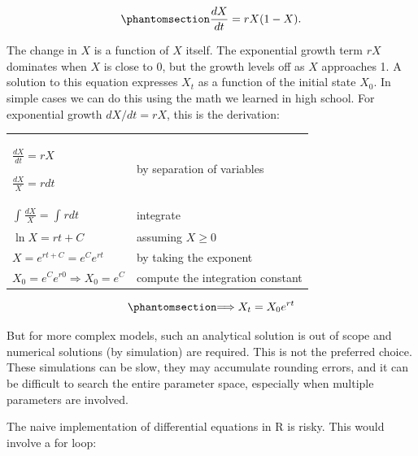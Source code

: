 \documentclass[
  a4paper,
  DIV=11,
  numbers=noendperiod,
  oneside]{scrreprt}
\begin{document}
\begin{equation}\phantomsection\label{eq-ch4n-1-old-21}{
\frac{dX}{dt} = rX(1 - X).
}\end{equation}

The change in \(X\) is a function of \(X\) itself. The exponential
growth term \(rX\) dominates when \(X\) is close to 0, but the growth
levels off as \(X\) approaches 1. A solution to this equation expresses
\(X_{t}\) as a function of the initial state \(X_{0}\). In simple cases
we can do this using the math we learned in high school. For exponential
growth \(dX/dt = rX\), this is the derivation:

\begin{longtable}[]{@{}
  >{\raggedright\arraybackslash}p{}
  >{\raggedright\arraybackslash}p{}@{}}
\toprule\noalign{}
\endhead
\bottomrule\noalign{}
\endlastfoot
\(\frac{dX}{dt} = rX\)

\(\frac{dX}{X} = rdt\) & by separation of variables \\
\(\int_{}^{}\frac{dX}{X} = \int_{}^{}{rdt}\) & integrate \\
\(\ln X = rt + C\) & assuming \(X \geq 0\) \\
\(X = e^{rt + C} = e^{C}e^{rt}\) & by taking the exponent \\
\(X_{0} = e^{C}e^{r0} \Longrightarrow X_{0} = e^{C}\) & compute the
integration constant \\
\end{longtable}

\begin{equation}\phantomsection\label{eq-ch4n-2-old-22}{
\Longrightarrow X_{t} = {X_{0}e}^{rt}
}\end{equation}

But for more complex models, such an analytical solution is out of scope
and numerical solutions (by simulation) are required. This is not the
preferred choice. These simulations can be slow, they may accumulate
rounding errors, and it can be difficult to search the entire parameter
space, especially when multiple parameters are involved.

The naive implementation of differential equations in R is risky. This
would involve a for loop:
\end{document}

